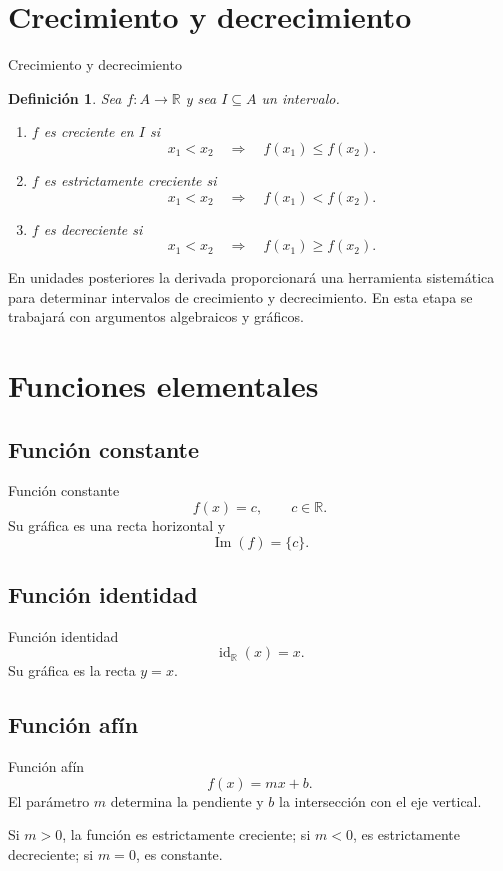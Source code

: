 \documentclass[aspectratio=169,10pt]{beamer}
\newtheorem{definicion}{Definición}
\newcommand{\R}{\mathbb{R}}
\newcommand{\Ima}{\operatorname{Im}}
\newcommand{\id}{\operatorname{id}}
\begin{document}
\section{Crecimiento y decrecimiento}
\begin{frame}{Crecimiento y decrecimiento}
\begin{definicion}
Sea $f:A\to\R$ y sea $I\subseteq A$ un intervalo.

\begin{enumerate}
    \item $f$ es \emph{creciente} en $I$ si
    \[
    x_1<x_2\quad\Longrightarrow\quad f(x_1)\leq f(x_2).
    \]
    \item $f$ es \emph{estrictamente creciente} si
    \[
    x_1<x_2\quad\Longrightarrow\quad f(x_1)<f(x_2).
    \]
    \item $f$ es \emph{decreciente} si
    \[
    x_1<x_2\quad\Longrightarrow\quad f(x_1)\geq f(x_2).
    \]
\end{enumerate}
\end{definicion}

En unidades posteriores la derivada proporcionará una herramienta sistemática
para determinar intervalos de crecimiento y decrecimiento. En esta etapa se
trabajará con argumentos algebraicos y gráficos.

\end{frame}
\section{Funciones elementales}
\subsection{Función constante}
\begin{frame}{Función constante}
\[
f(x)=c,\qquad c\in\R.
\]
Su gráfica es una recta horizontal y
\[
\Ima(f)=\{c\}.
\]
\end{frame}
\subsection{Función identidad}
\begin{frame}{Función identidad}
\[
\id_{\R}(x)=x.
\]
Su gráfica es la recta $y=x$.
\end{frame}
\subsection{Función afín}
\begin{frame}{Función afín}
\[
f(x)=mx+b.
\]
El parámetro $m$ determina la pendiente y $b$ la intersección con el eje
vertical.

Si $m>0$, la función es estrictamente creciente; si $m<0$, es estrictamente
decreciente; si $m=0$, es constante.
\end{frame}
\end{document}
